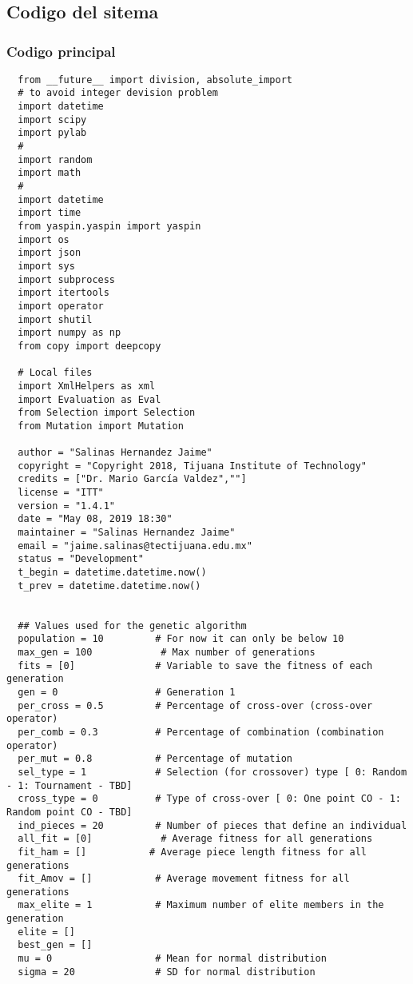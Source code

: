 \chapter{} 

\section{Codigo del sitema}
\label{app:code}

\subsection{Codigo principal}
\label{code:main_code}

\begin{verbatim}
  from __future__ import division, absolute_import                 
  # to avoid integer devision problem
  import datetime 
  import scipy
  import pylab
  #
  import random
  import math
  #
  import datetime
  import time
  from yaspin.yaspin import yaspin
  import os
  import json
  import sys
  import subprocess
  import itertools
  import operator
  import shutil
  import numpy as np
  from copy import deepcopy

  # Local files
  import XmlHelpers as xml
  import Evaluation as Eval 
  from Selection import Selection
  from Mutation import Mutation

  author = "Salinas Hernandez Jaime"
  copyright = "Copyright 2018, Tijuana Institute of Technology"
  credits = ["Dr. Mario García Valdez",""]
  license = "ITT"
  version = "1.4.1"
  date = "May 08, 2019 18:30"
  maintainer = "Salinas Hernandez Jaime"
  email = "jaime.salinas@tectijuana.edu.mx"
  status = "Development"
  t_begin = datetime.datetime.now()
  t_prev = datetime.datetime.now()


  ## Values used for the genetic algorithm
  population = 10         # For now it can only be below 10
  max_gen = 100            # Max number of generations
  fits = [0]              # Variable to save the fitness of each generation
  gen = 0                 # Generation 1
  per_cross = 0.5         # Percentage of cross-over (cross-over operator)
  per_comb = 0.3          # Percentage of combination (combination operator)
  per_mut = 0.8           # Percentage of mutation
  sel_type = 1            # Selection (for crossover) type [ 0: Random - 1: Tournament - TBD]
  cross_type = 0          # Type of cross-over [ 0: One point CO - 1: Random point CO - TBD]
  ind_pieces = 20         # Number of pieces that define an individual
  all_fit = [0]            # Average fitness for all generations
  fit_ham = []           # Average piece length fitness for all generations
  fit_Amov = []           # Average movement fitness for all generations
  max_elite = 1           # Maximum number of elite members in the generation
  elite = []
  best_gen = []
  mu = 0                  # Mean for normal distribution
  sigma = 20              # SD for normal distribution


\end{verbatim}
